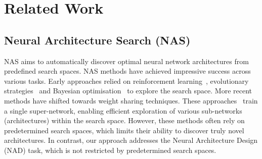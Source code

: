 \section{Related Work}
\subsection{Neural Architecture Search (NAS)}
NAS aims to automatically discover optimal neural network architectures from predefined search spaces. NAS methods have achieved impressive success across various tasks. 
Early approaches relied on reinforcement learning~\cite{williams1992simple,pham2018efficient}, evolutionary strategies~\cite{real2019regularized} and Bayesian optimisation~\cite{kandasamy2018neural} to explore the search space.
More recent methods have shifted towards weight sharing techniques. These approaches~\cite{liu2018darts,dong2019one,hu2020dsnas,xu2019pc,xie2018snas,zhang2021idarts,dong2019searching,chen2020drnas,ye2022b} train a single super-network, enabling efficient exploration of various sub-networks (architectures) within the search space.
However, these methods often rely on predetermined search spaces, which limits their ability to discover truly novel architectures. In contrast, our approach addresses the Neural Architecture Design (NAD) task, which is not restricted by predetermined search spaces.

